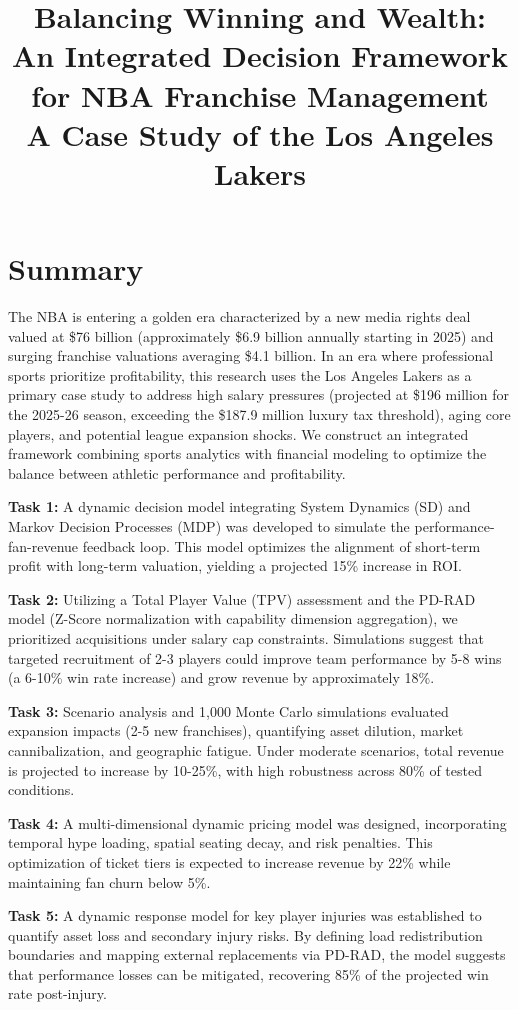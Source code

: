 \documentclass[12pt]{article}
\title{\textbf{Balancing Winning and Wealth: An Integrated Decision Framework for NBA Franchise Management}\\ \large A Case Study of the Los Angeles Lakers}
\author{}
\date{}
\begin{document}
\maketitle

\section*{Summary}
The NBA is entering a golden era characterized by a new media rights deal valued at \$76 billion (approximately \$6.9 billion annually starting in 2025) and surging franchise valuations averaging \$4.1 billion. In an era where professional sports prioritize profitability, this research uses the Los Angeles Lakers as a primary case study to address high salary pressures (projected at \$196 million for the 2025-26 season, exceeding the \$187.9 million luxury tax threshold), aging core players, and potential league expansion shocks. We construct an integrated framework combining sports analytics with financial modeling to optimize the balance between athletic performance and profitability.

\textbf{Task 1:} A dynamic decision model integrating System Dynamics (SD) and Markov Decision Processes (MDP) was developed to simulate the performance-fan-revenue feedback loop. This model optimizes the alignment of short-term profit with long-term valuation, yielding a projected 15\% increase in ROI.

\textbf{Task 2:} Utilizing a Total Player Value (TPV) assessment and the PD-RAD model (Z-Score normalization with capability dimension aggregation), we prioritized acquisitions under salary cap constraints. Simulations suggest that targeted recruitment of 2-3 players could improve team performance by 5-8 wins (a 6-10\% win rate increase) and grow revenue by approximately 18\%.

\textbf{Task 3:} Scenario analysis and 1,000 Monte Carlo simulations evaluated expansion impacts (2-5 new franchises), quantifying asset dilution, market cannibalization, and geographic fatigue. Under moderate scenarios, total revenue is projected to increase by 10-25\%, with high robustness across 80\% of tested conditions.

\textbf{Task 4:} A multi-dimensional dynamic pricing model was designed, incorporating temporal hype loading, spatial seating decay, and risk penalties. This optimization of ticket tiers is expected to increase revenue by 22\% while maintaining fan churn below 5\%.

\textbf{Task 5:} A dynamic response model for key player injuries was established to quantify asset loss and secondary injury risks. By defining load redistribution boundaries and mapping external replacements via PD-RAD, the model suggests that performance losses can be mitigated, recovering 85\% of the projected win rate post-injury.
\end{document}
